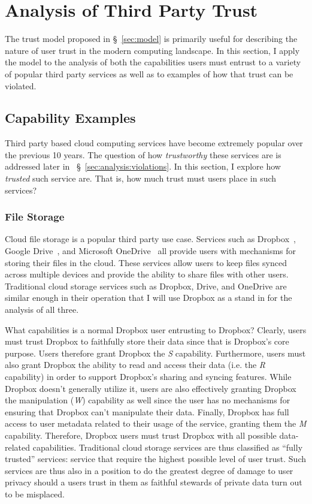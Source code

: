 \section{Analysis of Third Party Trust}
\label{sec:analysis}

The trust model proposed in \S~\ref{sec:model} is primarily useful for
describing the nature of user trust in the modern computing
landscape. In this section, I apply the model to the analysis of both
the capabilities users must entrust to a variety of popular third
party services as well as to examples of how that trust can be
violated.

\subsection{Capability Examples}
\label{sec:analysis:capabilites}

Third party based cloud computing services have become extremely
popular over the previous 10 years.  The question of how
\textit{trustworthy} these services are is addressed later in
~\S~\ref{sec:analysis:violations}. In this section, I explore how
\textit{trusted} such service are. That is, how much trust must users
place in such services?

\subsubsection{File Storage}

Cloud file storage is a popular third party use case. Services such as
Dropbox~\cite{dropbox}, Google Drive~\cite{google-drive}, and
Microsoft OneDrive~\cite{microsoft-onedrive} all provide users with
mechanisms for storing their files in the cloud. These services allow
users to keep files synced across multiple devices and provide the
ability to share files with other users. Traditional cloud storage
services such as Dropbox, Drive, and OneDrive are similar enough in
their operation that I will use Dropbox as a stand in for the analysis
of all three.

What capabilities is a normal Dropbox user entrusting to Dropbox?
Clearly, users must trust Dropbox to faithfully store their data since
that is Dropbox's core purpose. Users therefore grant Dropbox the
\emph{S} capability. Furthermore, users must also grant Dropbox the
ability to read and access their data (i.e. the \emph{R} capability)
in order to support Dropbox's sharing and syncing features. While
Dropbox doesn't generally utilize it, users are also effectively
granting Dropbox the manipulation (\emph{W}) capability as well since
the user has no mechanisms for ensuring that Dropbox can't manipulate
their data. Finally, Dropbox has full access to user metadata related
to their usage of the service, granting them the \emph{M}
capability. Therefore, Dropbox users must trust Dropbox with all
possible data-related capabilities. Traditional cloud storage services
are thus classified as ``fully trusted'' services: service that
require the highest possible level of user trust. Such services are
thus also in a position to do the greatest degree of damage to user
privacy should a users trust in them as faithful stewards of private
data turn out to be misplaced.

